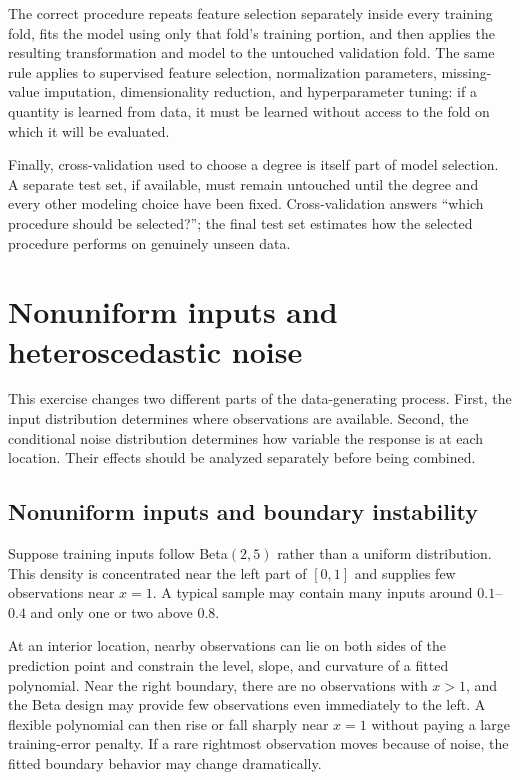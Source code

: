 \documentclass[11pt,a4paper]{article}
\begin{document}
The correct procedure repeats feature selection separately inside every training fold, fits the model using only that fold's training portion, and then applies the resulting transformation and model to the untouched validation fold. The same rule applies to supervised feature selection, normalization parameters, missing-value imputation, dimensionality reduction, and hyperparameter tuning: if a quantity is learned from data, it must be learned without access to the fold on which it will be evaluated.

Finally, cross-validation used to choose a degree is itself part of model selection. A separate test set, if available, must remain untouched until the degree and every other modeling choice have been fixed. Cross-validation answers ``which procedure should be selected?''; the final test set estimates how the selected procedure performs on genuinely unseen data.

\section{Nonuniform inputs and heteroscedastic noise}
\label{sec:hetero}

This exercise changes two different parts of the data-generating process. First, the input distribution determines where observations are available. Second, the conditional noise distribution determines how variable the response is at each location. Their effects should be analyzed separately before being combined.

\subsection{Nonuniform inputs and boundary instability}

Suppose training inputs follow Beta$(2,5)$ rather than a uniform distribution. This density is concentrated near the left part of $[0,1]$ and supplies few observations near $x=1$. A typical sample may contain many inputs around $0.1$--$0.4$ and only one or two above $0.8$.

At an interior location, nearby observations can lie on both sides of the prediction point and constrain the level, slope, and curvature of a fitted polynomial. Near the right boundary, there are no observations with $x>1$, and the Beta design may provide few observations even immediately to the left. A flexible polynomial can then rise or fall sharply near $x=1$ without paying a large training-error penalty. If a rare rightmost observation moves because of noise, the fitted boundary behavior may change dramatically.
\end{document}
